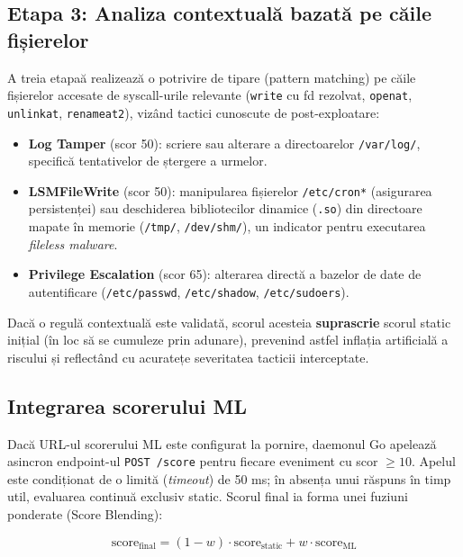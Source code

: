 \subsection{Etapa 3: Analiza contextuală bazată pe căile fișierelor}
\label{subsec:path_alerts}

\par A treia etapaă realizează o potrivire de tipare (pattern matching) pe căile fișierelor accesate de syscall-urile relevante (\texttt{write} cu fd rezolvat, \texttt{openat}, \texttt{unlinkat}, \texttt{renameat2}), vizând tactici cunoscute de post-exploatare:

\begin{itemize}
    \item \textbf{Log Tamper} (scor 50): scriere sau alterare a directoarelor \texttt{/var/log/}, specifică tentativelor de ștergere a urmelor.
    \item \textbf{LSMFileWrite} (scor 50): manipularea fișierelor \texttt{/etc/cron*} (asigurarea persistenței) sau deschiderea bibliotecilor dinamice (\texttt{.so}) din directoare mapate în memorie (\texttt{/tmp/}, \texttt{/dev/shm/}), un indicator pentru executarea \textit{fileless malware}.
    \item \textbf{Privilege Escalation} (scor 65): alterarea directă a bazelor de date de autentificare (\texttt{/etc/passwd}, \texttt{/etc/shadow}, \texttt{/etc/sudoers}).
\end{itemize}

\par Dacă o regulă contextuală este validată, scorul acesteia \textbf{suprascrie} scorul static inițial (în loc să se cumuleze prin adunare), prevenind astfel inflația artificială a riscului și reflectând cu acuratețe severitatea tacticii interceptate.


\subsection{Integrarea scorerului ML}
\label{subsec:ml_integration}

\par Dacă URL-ul scorerului ML este configurat la pornire, daemonul Go apelează asincron endpoint-ul \texttt{POST /score} pentru fiecare eveniment cu scor $\geq 10$. Apelul este condiționat de o limită (\textit{timeout}) de 50 ms; în absența unui răspuns în timp util, evaluarea continuă exclusiv static. Scorul final ia forma unei fuziuni ponderate (Score Blending):

\begin{equation}
    \text{score}_{\text{final}} = (1 - w) \cdot \text{score}_{\text{static}} + w \cdot \text{score}_{\text{ML}}
    \label{eq:blended_score}
\end{equation}


